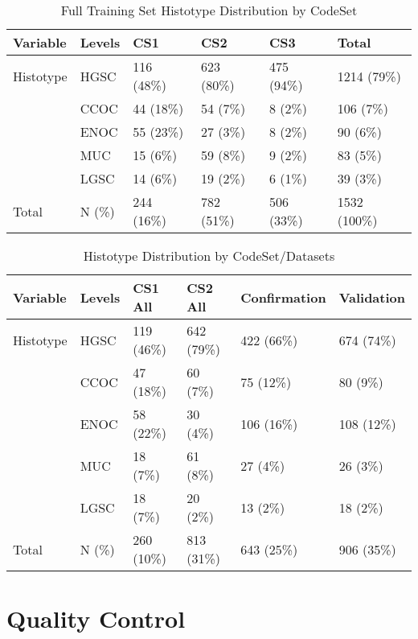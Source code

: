 \documentclass[
]{report}
\begin{document}
\begin{table}

\caption{\label{tab:train-hist-codeset}Full Training Set Histotype Distribution by CodeSet}
\centering
\begin{tabular}[t]{l|l|l|l|l|l}
\hline
Variable & Levels & CS1 & CS2 & CS3 & Total\\
\hline
Histotype & HGSC & 116 (48\%) & 623 (80\%) & 475 (94\%) & 1214 (79\%)\\
\hline
 & CCOC & 44 (18\%) & 54 (7\%) & 8 (2\%) & 106 (7\%)\\
\hline
 & ENOC & 55 (23\%) & 27 (3\%) & 8 (2\%) & 90 (6\%)\\
\hline
 & MUC & 15 (6\%) & 59 (8\%) & 9 (2\%) & 83 (5\%)\\
\hline
 & LGSC & 14 (6\%) & 19 (2\%) & 6 (1\%) & 39 (3\%)\\
\hline
Total & N (\%) & 244 (16\%) & 782 (51\%) & 506 (33\%) & 1532 (100\%)\\
\hline
\end{tabular}
\end{table}

\begin{table}

\caption{\label{tab:hist-codeset-dataset}Histotype Distribution by CodeSet/Datasets}
\centering
\begin{tabular}[t]{l|l|l|l|l|l}
\hline
Variable & Levels & CS1 All & CS2 All & Confirmation & Validation\\
\hline
Histotype & HGSC & 119 (46\%) & 642 (79\%) & 422 (66\%) & 674 (74\%)\\
\hline
 & CCOC & 47 (18\%) & 60 (7\%) & 75 (12\%) & 80 (9\%)\\
\hline
 & ENOC & 58 (22\%) & 30 (4\%) & 106 (16\%) & 108 (12\%)\\
\hline
 & MUC & 18 (7\%) & 61 (8\%) & 27 (4\%) & 26 (3\%)\\
\hline
 & LGSC & 18 (7\%) & 20 (2\%) & 13 (2\%) & 18 (2\%)\\
\hline
Total & N (\%) & 260 (10\%) & 813 (31\%) & 643 (25\%) & 906 (35\%)\\
\hline
\end{tabular}
\end{table}

\hypertarget{quality-control}{%
\section{Quality Control}\label{quality-control}}
\end{document}
